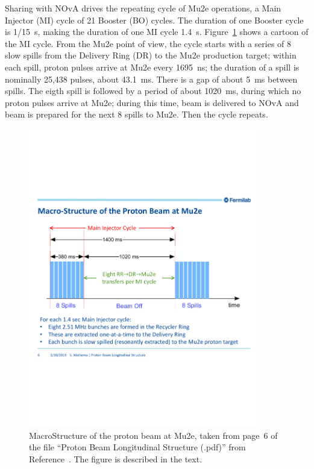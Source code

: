 Sharing with NOvA drives the repeating cycle of Mu2e operations, a Main Injector (MI) cycle of
21 Booster (BO) cycles.
The duration of one Booster cycle is 1/15~s,
making the duration of one MI cycle 1.4~s.
Figure~\ref{fig:beamMacroStructure} shows a cartoon of the MI cycle.
From the Mu2e point of view, the cycle starts with a series of 8 slow spills
from the Delivery Ring (DR) to the Mu2e production target;
within each spill, proton pulses arrive at Mu2e every 1695~ns;
the duration of a spill is nominally 25,438 pulses, about 43.1~ms.
There is a gap of about 5~ms between spills.
The eigth spill is followed by a period of about 1020~ms,
during which no proton pulses arrive at Mu2e;
during this time, beam is delivered to NOvA
and beam is prepared for the next 8 spills to Mu2e.
Then the cycle repeats.

\begin{figure}[tbp]
\centering
\includegraphics[width=0.9\textwidth]{figures/ProtonBeamLongitudinalStructure2019-01-10_page6.pdf}
\caption[MacroStructure of the Proton Beam at Mu2e]{
  MacroStructure of the proton beam at Mu2e, taken from page~6 of
  the file ``Proton Beam Longitudinal Structure (.pdf)'' from
  Reference~.  The figure is described in the text.}
\label{fig:beamMacroStructure}
\end{figure}

